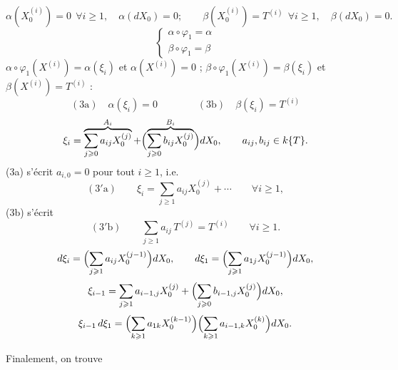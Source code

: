 \documentclass[11pt,a4paper]{article}
\begin{document}
\[
  \alpha(X_0^{(i)}) = 0 \ \ \forall i \geqslant 1, \quad \alpha(dX_0) = 0 ;
  \qquad
  \beta(X_0^{(i)}) = T^{(i)} \ \ \forall i \geqslant 1, \quad \beta(dX_0) = 0 .
\]
\[
  \begin{cases}
    \alpha \circ \varphi_1 = \alpha \\
    \beta \circ \varphi_1 = \beta
  \end{cases}
\]
$\alpha\circ\varphi_1(X^{(i)}) = \alpha(\xi_i)$ et $\alpha(X^{(i)}) = 0$ ;
$\beta\circ\varphi_1(X^{(i)}) = \beta(\xi_i)$ et $\beta(X^{(i)}) = T^{(i)}$ :
\[
  (3\mathrm{a})\quad \boxed{\alpha(\xi_i) = 0}
  \qquad\qquad
  (3\mathrm{b})\quad \boxed{\beta(\xi_i) = T^{(i)}}
\]
\[
  \xi_i = \overbrace{\sum_{j \geqslant 0} a_{ij} X_0^{(j)}}^{A_i}
        + \Bigl(\overbrace{\sum_{j \geqslant 0} b_{ij} X_0^{(j)}}^{B_i}\Bigr) dX_0 ,
  \qquad a_{ij}, b_{ij} \in k\{T\} .
\]
(3a) s'écrit $a_{i,0} = 0$ pour tout $i \geqslant 1$, i.e.
\[
  (3'\mathrm{a})\qquad \xi_i = \sum_{j \geqslant 1} a_{ij} X_0^{(j)} + \cdots
  \qquad \forall i \geqslant 1 ,
\]
(3b) s'écrit
\[
  (3'\mathrm{b})\qquad \sum_{j \geqslant 1} a_{ij}\,T^{(j)} = T^{(i)} \qquad \forall i \geqslant 1 .
\]
\[
  d\xi_i = \Bigl(\sum_{j \geqslant 1} a_{ij} X_0^{(j-1)}\Bigr) dX_0 ,
  \qquad
  d\xi_1 = \Bigl(\sum_{j \geqslant 1} a_{1j} X_0^{(j-1)}\Bigr) dX_0 ,
\]
\[
  \xi_{i-1} = \sum_{j \geqslant 1} a_{i-1,j} X_0^{(j)}
            + \Bigl(\sum_{j \geqslant 0} b_{i-1,j} X_0^{(j)}\Bigr) dX_0 ,
\]
\[
  \xi_{i-1}\,d\xi_1
  = \Bigl(\sum_{k \geqslant 1} a_{1k} X_0^{(k-1)}\Bigr)
    \Bigl(\sum_{k \geqslant 1} a_{i-1,k} X_0^{(k)}\Bigr) dX_0 .
\]

Finalement, on trouve
\end{document}
